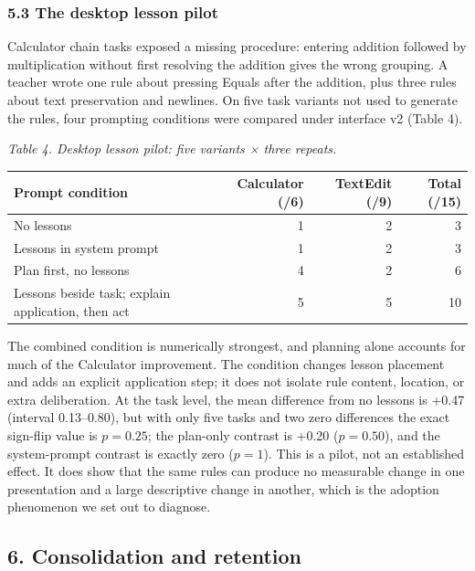 \documentclass[
  10pt,
]{article}
\newcounter{none} %
\begin{document}
\subsubsection{5.3 The desktop lesson
pilot}\label{the-desktop-lesson-pilot}

Calculator chain tasks exposed a missing procedure: entering addition
followed by multiplication without first resolving the addition gives
the wrong grouping. A teacher wrote one rule about pressing Equals after
the addition, plus three rules about text preservation and newlines. On
five task variants not used to generate the rules, four prompting
conditions were compared under interface v2 (Table 4).

\emph{Table 4. Desktop lesson pilot: five variants × three repeats.}

{\def\LTcaptype{none} %
\begin{longtable}[]{@{}lrrr@{}}
\toprule\noalign{}
Prompt condition & Calculator (/6) & TextEdit (/9) & Total (/15) \\
\midrule\noalign{}
\endhead
\bottomrule\noalign{}
\endlastfoot
No lessons & 1 & 2 & 3 \\
Lessons in system prompt & 1 & 2 & 3 \\
Plan first, no lessons & 4 & 2 & 6 \\
Lessons beside task; explain application, then act & 5 & 5 & 10 \\
\end{longtable}
}

The combined condition is numerically strongest, and planning alone
accounts for much of the Calculator improvement. The condition changes
lesson placement and adds an explicit application step; it does not
isolate rule content, location, or extra deliberation. At the task
level, the mean difference from no lessons is +0.47 (interval
0.13--0.80), but with only five tasks and two zero differences the exact
sign-flip value is \(p=0.25\); the plan-only contrast is +0.20
(\(p=0.50\)), and the system-prompt contrast is exactly zero (\(p=1\)).
This is a pilot, not an established effect. It does show that the same
rules can produce no measurable change in one presentation and a large
descriptive change in another, which is the adoption phenomenon we set
out to diagnose.

\subsection{6. Consolidation and
retention}\label{consolidation-and-retention}
\end{document}
